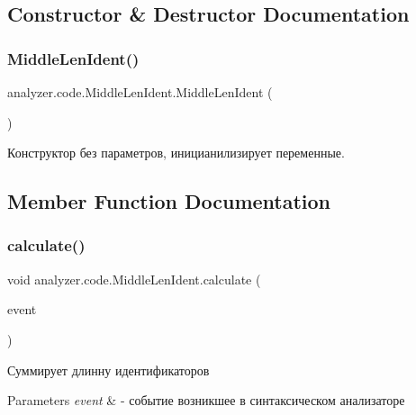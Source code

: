 \subsection{Constructor \& Destructor Documentation}
\mbox{\label{classanalyzer_1_1code_1_1MiddleLenIdent_a213f80eaaa3184f332af26ac940eed65}} 
\subsubsection{\texorpdfstring{Middle\+Len\+Ident()}{MiddleLenIdent()}}
{\footnotesize\ttfamily analyzer.\+code.\+Middle\+Len\+Ident.\+Middle\+Len\+Ident (\begin{DoxyParamCaption}{ }\end{DoxyParamCaption})\hspace{0.3cm}{\ttfamily [inline]}}

Конструктор без параметров, иницианилизирует переменные. 

\subsection{Member Function Documentation}
\mbox{\label{classanalyzer_1_1code_1_1MiddleLenIdent_a8cdcf24eba4d3db76e9483ffaa2b6ea3}} 
\subsubsection{\texorpdfstring{calculate()}{calculate()}}
{\footnotesize\ttfamily void analyzer.\+code.\+Middle\+Len\+Ident.\+calculate (\begin{DoxyParamCaption}\item[{\hyperlink{classanalyzer_1_1code_1_1Event}{Event}}]{event }\end{DoxyParamCaption})\hspace{0.3cm}{\ttfamily [inline]}}

Суммирует длинну идентификаторов 
\begin{DoxyParams}{Parameters}
{\em event} & -\/ событие возникшее в синтаксическом анализаторе \\
\hline
\end{DoxyParams}


